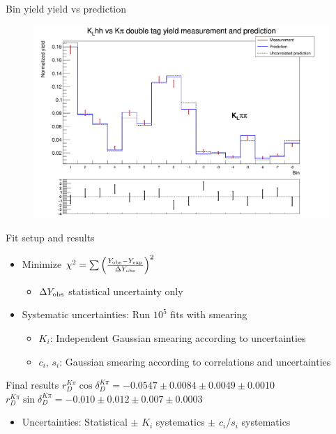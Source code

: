 \documentclass{beamer}
\begin{document}
\begin{frame}{Bin yield yield vs prediction}
  \begin{figure}
    \centering
    \includegraphics[width=\textwidth]{KLpipiVersusKpiYields.png}
  \end{figure}
\end{frame}

\begin{frame}{Fit setup and results}
  \begin{itemize}
    \setlength\itemsep{1.5em}
    \item{Minimize $\chi^2 = \sum\Big(\frac{Y_{\rm obs} - Y_{\rm exp}}{\Delta Y_{\rm obs}}\Big)^2$}
    \begin{itemize}
      \item{$\Delta Y_{\rm obs}$ statistical uncertainty only}
    \end{itemize}
    \item{Systematic uncertainties: Run $10^5$ fits with smearing}
    \begin{itemize}
      \item{$K_i$: Independent Gaussian smearing according to uncertainties}
      \item{$c_i$, $s_i$: Gaussian smearing according to correlations and uncertainties}
    \end{itemize}
  \end{itemize}
  \vspace{0.3cm}
  \begin{block}{Final results}
    \vspace{0.1cm}
    $r_D^{K\pi}\cos\delta_D^{K\pi} = -0.0547\pm0.0084\pm0.0049\pm0.0010$ \\
    \vspace{0.3cm}
    $r_D^{K\pi}\sin\delta_D^{K\pi} = -0.010\pm0.012\pm0.007\pm0.0003$
    \vspace{0.1cm}
  \end{block}
  \begin{itemize}
    \item{Uncertainties: Statistical $\pm$ $K_i$ systematics $\pm$ $c_i$/$s_i$ systematics}
  \end{itemize}
\end{frame}
\end{document}
